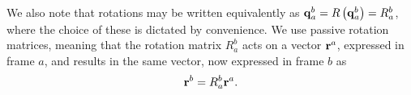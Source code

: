 We also note that rotations may be written equivalently as $\boldsymbol{\mathrm{q}}_a^b=R\left(\boldsymbol{\mathrm{q}}_a^b\right)=R_a^b$, where the choice of these is dictated by convenience.
We use passive rotation matrices, meaning that the rotation matrix $R_a^b$ acts
on a vector $\boldsymbol{\mathrm{r}}^a$, expressed in frame $a$, and results in the same
vector, now expressed in frame $b$ as
\begin{equation}
\boldsymbol{\mathrm{r}}^b = R_a^b \boldsymbol{\mathrm{r}}^a .
\end{equation}



